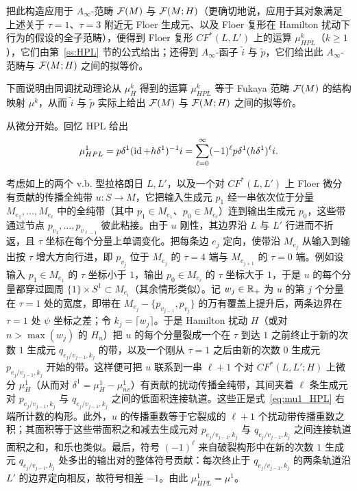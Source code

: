 把此构造应用于 $A_\infty$-范畴 $\mathcal{F}(M)$ 与 $\mathcal{F}(M;H)$（更确切地说，应用于其对象满足上述关于 $\tau=1$、$\tau=3$ 附近无 Floer 生成元、以及 Floer 复形在 Hamilton 扰动下行为的假设的全子范畴），便得到 Floer 复形 $CF^*(L,L')$ 上的运算 $\mu^k_{HPL}$（$k\geq 1$），它们由第~\ref{ss:HPL} 节的公式给出；还得到 $A_\infty$-函子 $\tilde{i}$ 与 $\tilde{p}$，它们给出此 $A_\infty$-范畴与 $\mathcal{F}(M;H)$ 之间的拟等价。

下面说明由同调扰动理论从 $\mu^k_H$ 得到的运算 $\mu^k_{HPL}$ 等于 Fukaya 范畴 $\mathcal{F}(M)$ 的结构映射 $\mu^k$，从而 $\tilde{i}$ 与 $\tilde{p}$ 实际上给出 $\mathcal{F}(M)$ 与 $\mathcal{F}(M;H)$ 之间的拟等价。

从微分开始。回忆 HPL 给出
\begin{equation}\label{eq:mu1_HPL}
\mu^1_{HPL}=p\delta^1(\operatorname{id}+h\delta^1)^{-1}i=\sum_{\ell=0}^\infty
(-1)^\ell p\delta^1(h\delta^1)^\ell i.
\end{equation}

考虑如上的两个 v.b. 型拉格朗日 $L,L'$，以及一个对 $CF^*(L,L')$ 上 Floer 微分有贡献的传播全纯带 $u:S\to M$，它把输入生成元 $p_1$ 经一串依次位于分量 $M_{e_1},\dots,M_{e_\ell}$ 中的全纯带（其中 $p_1\in M_{e_1}$、$p_0\in M_{e_\ell}$）连到输出生成元 $p_0$，这些带通过节点 $p_{v_1},\dots,p_{v_{\ell-1}}$ 彼此粘接。由于 $u$ 刚性，其边界沿 $L$ 与 $L'$ 行进而不折返，且 $\tau$ 坐标在每个分量上单调变化。把每条边 $e_j$ 定向，使带沿 $M_{e_j}$ 从输入到输出按 $\tau$ 增大方向行进，即 $p_{v_j}$ 位于 $M_{e_j}$ 的 $\tau=4$ 端与 $M_{e_{j+1}}$ 的 $\tau=0$ 端。例如设输入 $p_1\in M_{e_1}$ 的 $\tau$ 坐标小于 $1$，输出 $p_0\in M_{e_\ell}$ 的 $\tau$ 坐标大于 $1$，于是 $u$ 的每个分量都穿过圆周 $\{1\}\times S^1\subset M_{e_i}$（其余情形类似）。记 $w_j\in \mathbb{R}_+$ 为 $u$ 的第 $j$ 个分量在 $\tau=1$ 处的宽度，即带在 $M_{e_j}-\{p_{v_{j-1}},p_{v_j}\}$ 的万有覆盖上提升后，两条边界在 $\tau=1$ 处 $\psi$ 坐标之差；令 $k_j=\lceil w_j \rceil$。于是 Hamilton 扰动 $H$（或对 $n>\max(w_j)$ 的 $H_n$）把 $u$ 的每个分量裂成一个在 $\tau$ 到达 $1$ 之前终止于新的次数 $1$ 生成元 $q_{e_j/v_{j-1},k_j}$ 的带，以及一个刚从 $\tau=1$ 之后由新的次数 $0$ 生成元 $p_{e_j/v_{j-1},k_j}$ 开始的带。这样便可把 $u$ 联系到一串 $\ell+1$ 个对 $CF^*(L,L';H)$ 上微分 $\mu^1_H$（从而对 $\delta^1=\mu^1_H-\mu^1_{nv}$）有贡献的扰动传播全纯带，其间夹着 $\ell$ 条生成元对 $p_{e_j/v_{j-1},k_j}$ 与 $q_{e_j/v_{j-1},k_j}$ 之间的低面积连接轨道。这些正是式~\eqref{eq:mu1_HPL} 右端所计数的构形。此外，$u$ 的传播重数等于它裂成的 $\ell+1$ 个扰动带传播重数之积；其面积等于这些带面积之和减去生成元对 $p_{e_j/v_{j-1},k_j}$ 与 $q_{e_j/v_{j-1},k_j}$ 之间连接轨道面积之和，和乐也类似。最后，符号 $(-1)^\ell$ 来自破裂构形中在新的次数 $1$ 生成元 $q_{e_j/v_{j-1},k_j}$ 处多出的输出对的整体符号贡献：每次终止于 $q_{e_j/v_{j-1},k_j}$ 的两条轨道沿 $L'$ 的边界定向相反，故符号相差 $-1$。由此 $\mu^1_{HPL}=\mu^1$。

